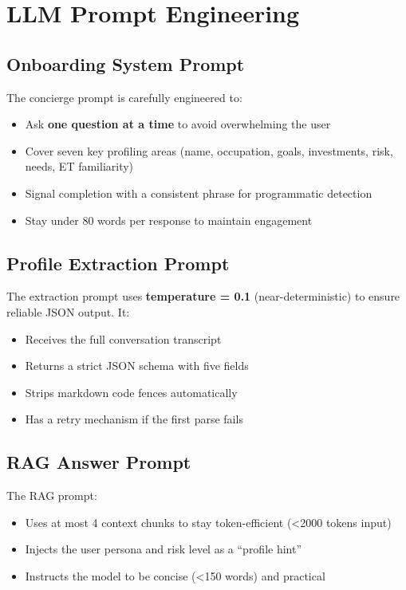 \documentclass[12pt,a4paper]{article}
\begin{document}
\section{LLM Prompt Engineering}

\subsection{Onboarding System Prompt}
The concierge prompt is carefully engineered to:
\begin{itemize}[noitemsep]
  \item Ask \textbf{one question at a time} to avoid overwhelming the user
  \item Cover seven key profiling areas (name, occupation, goals, investments, risk, needs, ET familiarity)
  \item Signal completion with a consistent phrase for programmatic detection
  \item Stay under 80 words per response to maintain engagement
\end{itemize}

\subsection{Profile Extraction Prompt}
The extraction prompt uses \textbf{temperature = 0.1} (near-deterministic) to ensure reliable JSON output. It:
\begin{itemize}[noitemsep]
  \item Receives the full conversation transcript
  \item Returns a strict JSON schema with five fields
  \item Strips markdown code fences automatically
  \item Has a retry mechanism if the first parse fails
\end{itemize}

\subsection{RAG Answer Prompt}
The RAG prompt:
\begin{itemize}[noitemsep]
  \item Uses at most 4 context chunks to stay token-efficient (\textless 2000 tokens input)
  \item Injects the user persona and risk level as a ``profile hint''
  \item Instructs the model to be concise (\textless 150 words) and practical
\end{itemize}
\end{document}
